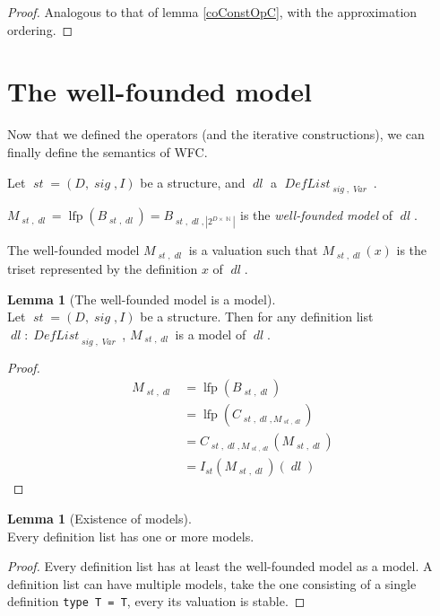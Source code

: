 \documentclass[oneside,12pt]{book}
\theoremstyle{definition}
\newtheorem{lemma}[theorem]{Lemma}
\theoremstyle{remark}
\newcommand\var[1]{\mathop{\mathit{#1}}\nolimits}
\newcommand{\sig}{\var{sig}}
\newcommand{\st}{\var{st}}
\newcommand{\Var}{\var{Var}}
\DeclareMathOperator{\lfp}{lfp}
\newcommand{\DefList}{\var{DefList}}
\newcommand{\dl}{\var{dl}}
\newcommand{\Nat}{\var{\mathbb{N}}}
\begin{document}
\begin{proof}
  Analogous to that of lemma \ref{coConstOpC}, with the approximation ordering.
\end{proof}

\section{The well-founded model}
Now that we defined the operators (and the iterative constructions),
we can finally define the semantics of WFC.

\begin{defBox}
  Let $\st = (D, \sig, I)$ be a structure, and $\dl$ a $\DefList_{\sig,\Var}$.
  
  \medskip \noindent
  $M_{\st,\dl} = \lfp(B_{\st,\dl}) = B_{\st,\dl,|2^{D \times \Nat}|}$
  is the \textit{well-founded model} of $\dl$.
\end{defBox}

The well-founded model $M_{\st,\dl}$ is a valuation such that $M_{\st,\dl}(x)$
is the triset represented by the definition $x$ of $\dl$.

\begin{lemma}[The well-founded model is a model] \hfill \\
  Let $\st = (D, \sig, I)$ be a structure. Then for any definition list
  $\dl\colon \DefList_{\sig,\Var}$, $M_{\st,\dl}$ is a model of $\dl$.
\end{lemma}

\begin{proof}
  \begin{align*}
    M_{\st,\dl} &= \lfp(B_{\st,\dl}) \\
      &= \lfp(C_{\st,\dl,M_{\st,\dl}}) \\
      &= C_{\st,\dl,M_{\st,\dl}}(M_{\st,\dl}) \\
      &= I_{\st}(M_{\st,\dl})(\dl)
  \end{align*}
\end{proof}

\begin{lemma}[Existence of models] \hfill \\
  Every definition list has one or more models.
\end{lemma}

\begin{proof}
  Every definition list has at least the well-founded model as a model.
  A definition list can have multiple models, take the one consisting
  of a single definition \texttt{type~T~=~T}, every its valuation is stable.
\end{proof}
\end{document}
